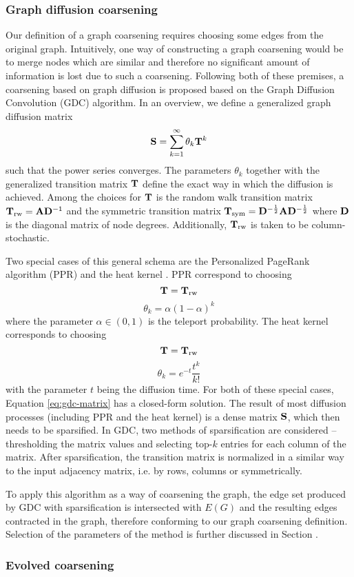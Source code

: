 \subsubsection{Graph diffusion coarsening}

Our definition of a graph coarsening requires choosing some edges from the original graph. Intuitively, one way of constructing a graph coarsening would be to merge nodes which are similar and therefore no significant amount of information is lost due to such a coarsening. Following both of these premises, a coarsening based on graph diffusion is proposed based on the Graph Diffusion Convolution (GDC) \cite{gasteiger_diffusion_2019} algorithm. In an overview, we define a generalized graph diffusion matrix
\begin{equation}\label{eq:gdc-matrix}
  \mathbf{S} = \sum_{k = 1}^\infty \theta_k \mathbf{T}^k
\end{equation}
such that the power series converges. The parameters \( \theta_k \) together with the generalized transition matrix \( \mathbf{T} \) define the exact way in which the diffusion is achieved. Among the choices for \( \mathbf{T} \) is the random walk transition matrix \( \mathbf{T}_ \mathrm{rw} = \mathbf{A} \mathbf{D}^{-1} \) and the symmetric transition matrix \( \mathbf{T}_\mathrm{sym} = \mathbf{D}^{-\frac{1}{2}} \mathbf{A} \mathbf{D}^{-\frac{1}{2}} \) where \( \mathbf{D} \) is the diagonal matrix of node degrees. Additionally, \( \mathbf{T}_\mathrm{rw} \) is taken to be column-stochastic.

Two special cases of this general schema are the Personalized PageRank algorithm (PPR) \cite{page_pagerank_1999} and the heat kernel \cite{kondor_diffusion_2002}. PPR correspond to choosing
\[ \mathbf{T} = \mathbf{T}_\mathrm{rw} \]
\[ \theta_k = \alpha \left( 1 - \alpha \right)^k \]
where the parameter \( \alpha \in \left( 0, 1 \right) \) is the teleport probability. The heat kernel corresponds to choosing
\[ \mathbf{T} = \mathbf{T}_\mathrm{rw} \]
\[ \theta_k = e^{-t} \frac{t^k}{k!} \]
with the parameter \( t \) being the diffusion time. For both of these special cases, Equation \ref{eq:gdc-matrix} has a closed-form solution. The result of most diffusion processes (including PPR and the heat kernel) is a dense matrix \( \mathbf{S} \), which then needs to be sparsified. In GDC, two methods of sparsification are considered -- thresholding the matrix values and selecting top-\( k \) entries for each column of the matrix. After sparsification, the transition matrix is normalized in a similar way to the input adjacency matrix, i.e. by rows, columns or symmetrically.

To apply this algorithm as a way of coarsening the graph, the edge set produced by GDC with sparsification is intersected with \( E \left( G \right) \) and the resulting edges contracted in the graph, therefore conforming to our graph coarsening definition. Selection of the parameters of the method is further discussed in Section .

\subsubsection{Evolved coarsening}
